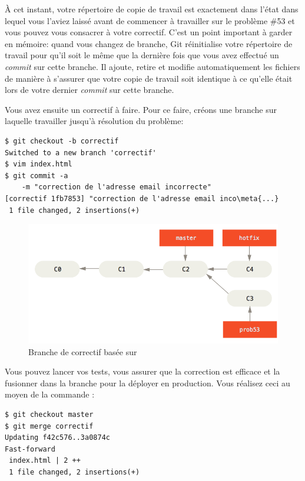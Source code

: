 À cet instant, votre répertoire de copie de travail est exactement dans l'état dans lequel vous l'aviez laissé avant de commencer à travailler sur le problème \#53 et vous pouvez vous consacrer à votre correctif.
C'est un point important à garder en mémoire: quand vous changez de branche, Git réinitialise votre répertoire de travail pour qu'il soit le même que la dernière fois que vous avez effectué un \emph{commit} sur cette branche.
Il ajoute, retire et modifie automatiquement les fichiers de manière à s'assurer que votre copie de travail soit identique à ce qu'elle était lors de votre dernier \emph{commit} sur cette branche.

Vous avez ensuite un correctif à faire.
Pour ce faire, créons une branche  sur laquelle travailler jusqu'à résolution du problème:
\begin{Schunk}
\begin{Verbatim}[commandchars=\\\{\}]
$ git checkout -b correctif
Switched to a new branch 'correctif'
$ vim index.html
$ git commit -a
    -m "correction de l'adresse email incorrecte"
[correctif 1fb7853] "correction de l'adresse email inco\meta{...}
 1 file changed, 2 insertions(+)
\end{Verbatim}
\end{Schunk}

\begin{figure}[H]
  \centering
  \includegraphics{images/basic-branching-4}
  \caption{Branche de correctif basée sur }
  \label{fig:git:basic-branching-4}
\end{figure}

Vous pouvez lancer vos tests, vous assurer que la correction est efficace et la fusionner dans la branche  pour la déployer en production.
Vous réalisez ceci au moyen de la commande :
\begin{Schunk}
\begin{Verbatim}
$ git checkout master
$ git merge correctif
Updating f42c576..3a0874c
Fast-forward
 index.html | 2 ++
 1 file changed, 2 insertions(+)
\end{Verbatim}
\end{Schunk}

